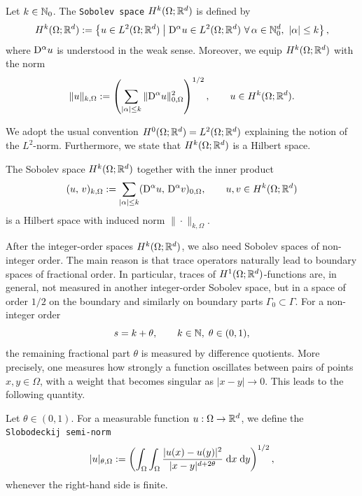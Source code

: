 \begin{definition}
	Let $k\in{\mathbb N}_0$. The {\tt Sobolev space} $H^k(\Omega;{\mathbb R}^d)$ is defined by
	\begin{equation*}
		H^k(\Omega;{\mathbb R}^d)
		:=
		\left\{u\in L^2(\Omega;{\mathbb R}^d)\;\middle|\; {\mathrm{D}}^\alpha u\in L^2(\Omega;{\mathbb R}^d)\ \forall\,\alpha\in{\mathbb N}_0^d,\ |\alpha|\le k\right\},
	\end{equation*}
	where ${\mathrm{D}}^\alpha u$ is understood in the weak sense. Moreover, we equip $H^k(\Omega;{\mathbb R}^d)$ with the norm
	\begin{equation*}
		\|u\|_{k,\Omega}
		:=
		\left(
		\sum_{|\alpha|\le k}\|{\mathrm{D}}^\alpha u\|_{0,\Omega}^2
		\right)^{1/2},
		\qquad u\in H^k(\Omega;{\mathbb R}^d).
	\end{equation*}
\end{definition}
We adopt the usual convention $H^0(\Omega;{\mathbb R}^d) = L^2(\Omega;{\mathbb R}^d)$ explaining the notion of the $L^2$-norm. Furthermore, we state that $H^k(\Omega;{\mathbb R}^d)$ is a Hilbert space.

\begin{proposition}
	The Sobolev space $H^k(\Omega;{\mathbb R}^d)$ together with the inner product
	\begin{equation*}
		(u,\, v)_{k,\Omega}:= \sum_{|\alpha|\le k}({\mathrm{D}}^\alpha u,\, {\mathrm{D}}^\alpha v)_{0,\Omega},\qquad u,v\in H^k(\Omega;{\mathbb R}^d)
	\end{equation*}
	is a Hilbert space with induced norm $\|\cdot\|_{k,\Omega}$.
	\eop
\end{proposition}

After the integer-order spaces $H^k(\Omega;{\mathbb R}^d)$, we also need Sobolev spaces of non-integer order. The main reason is that trace operators naturally lead to boundary spaces of fractional order. In particular, traces of $H^1(\Omega;{\mathbb R}^d)$-functions are, in general, not measured in another integer-order Sobolev space, but in a space of order $1/2$ on the boundary and similarly on boundary parts $\Gamma_0\subset\Gamma$. For a non-integer order
\begin{equation*}
	s=k+\theta,\qquad k\in {\mathbb N},\;\theta\in(0,1),
\end{equation*}
the remaining fractional part $\theta$ is measured by difference quotients. More precisely, one measures how strongly a function oscillates between pairs of points $x,y\in\Omega$, with a weight that becomes singular as $|x-y|\to 0$. This leads to the following quantity.

\begin{definition}
	Let $\theta\in(0,1)$. For a measurable function $u:\Omega\to {\mathbb R}^d$, we define the {\tt Slobodeckij semi-norm}
	\begin{equation*}
		|u|_{\theta,\Omega}
		:=
		\left(\int_\Omega\int_\Omega \frac{|u(x)-u(y)|^2}{|x-y|^{d+2\theta}}\;{{\mathrm{d}} x}\;{{\mathrm{d}} y}\right)^{1/2},
	\end{equation*}
	whenever the right-hand side is finite.
\end{definition}

